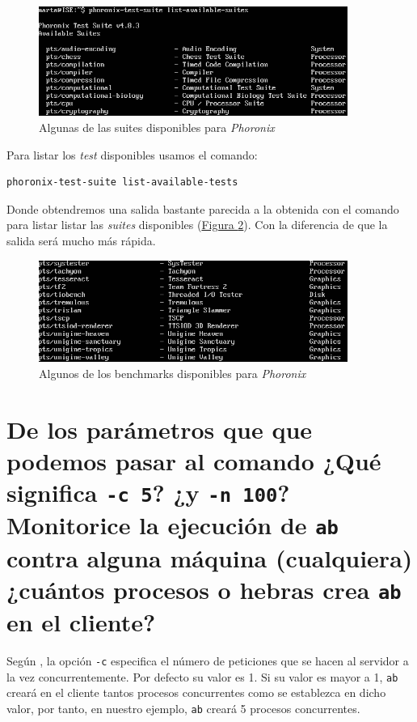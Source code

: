 \documentclass[10pt,a4paper,spanish]{article}
\numberwithin{equation}{section} %
\numberwithin{figure}{section} %
\numberwithin{table}{section} %
\begin{document}
\begin{figure}[!h]
    \centering
    \includegraphics[width=0.9\textwidth]{1}
    \caption{Algunas de las suites disponibles para \textit{Phoronix}}
    \label{suitesdisponibles}
\end{figure}

Para listar los \textit{test} disponibles usamos el comando:
\begin{verbatim}
phoronix-test-suite list-available-tests
\end{verbatim}

Donde obtendremos una salida bastante parecida a la obtenida con el comando para listar listar las \textit{suites} disponibles (\hyperref[testsdisponibles]{Figura \ref*{testsdisponibles}}). Con la diferencia de que la salida será mucho más rápida.

\begin{figure}[!h]
    \centering
    \includegraphics[width=0.9\textwidth]{2}
    \caption{Algunos de los benchmarks disponibles para \textit{Phoronix}}
    \label{testsdisponibles}
\end{figure}

\section{De los parámetros que que podemos pasar al comando ¿Qué significa \texttt{-c 5}? ¿y \texttt{-n 100}? Monitorice la ejecución de \texttt{ab} contra alguna máquina (cualquiera) ¿cuántos procesos o hebras crea \texttt{ab} en el cliente?}
Según \cite{ab}, la opción \texttt{-c} especifica el número de peticiones que se hacen al servidor a la vez concurrentemente. Por defecto su valor es 1. Si su valor es mayor a 1, \texttt{ab} creará en el cliente tantos procesos concurrentes como se establezca en dicho valor, por tanto, en nuestro ejemplo, \texttt{ab} creará 5 procesos concurrentes.
\end{document}
